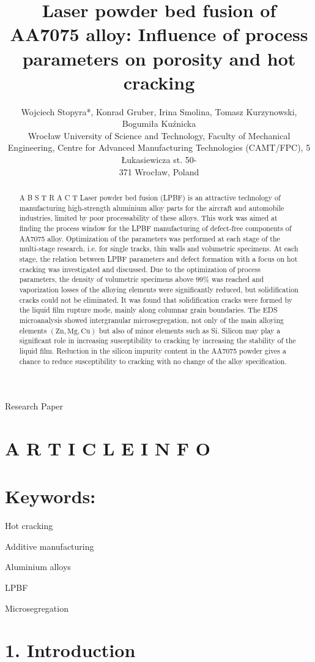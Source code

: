 \documentclass[10pt]{article}
\title{Laser powder bed fusion of AA7075 alloy: Influence of process parameters on porosity and hot cracking }
\author{Wojciech Stopyra*, Konrad Gruber, Irina Smolina, Tomasz Kurzynowski, Bogumiła Kuźnicka\\
Wrocław University of Science and Technology, Faculty of Mechanical Engineering, Centre for Advanced Manufacturing Technologies (CAMT/FPC), 5 Łukasiewicza st. 50-\\
371 Wrocław, Poland}
\date{}
\begin{document}
\maketitle
Research Paper



\section*{A R T I C L E I N F O}
\section*{Keywords:}
Hot cracking

Additive manufacturing

Aluminium alloys

LPBF

Microsegregation

\begin{abstract}
A B S T R A C T Laser powder bed fusion (LPBF) is an attractive technology of manufacturing high-strength aluminium alloy parts for the aircraft and automobile industries, limited by poor processability of these alloys. This work was aimed at finding the process window for the LPBF manufacturing of defect-free components of AA7075 alloy. Optimization of the parameters was performed at each stage of the multi-stage research, i.e. for single tracks, thin walls and volumetric specimens. At each stage, the relation between LPBF parameters and defect formation with a focus on hot cracking was investigated and discussed. Due to the optimization of process parameters, the density of volumetric specimens above $99 \%$ was reached and vaporization losses of the alloying elements were significantly reduced, but solidification cracks could not be eliminated. It was found that solidification cracks were formed by the liquid film rupture mode, mainly along columnar grain boundaries. The EDS microanalysis showed intergranular microsegregation, not only of the main alloying elements $(\mathrm{Zn}, \mathrm{Mg}, \mathrm{Cu})$ but also of minor elements such as Si. Silicon may play a significant role in increasing susceptibility to cracking by increasing the stability of the liquid film. Reduction in the silicon impurity content in the AA7075 powder gives a chance to reduce susceptibility to cracking with no change of the alloy specification.
\end{abstract}

\section*{1. Introduction}
\end{document}
